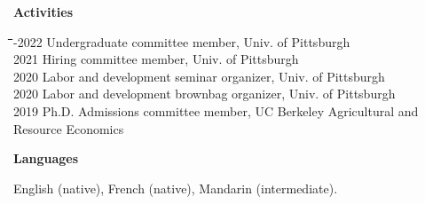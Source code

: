 \documentclass[10pt, oneside]{article}
\newcommand\mytabs{\hspace*{1cm}\=\hspace{1cm}\=\hspace{1cm}\=\hspace{1cm}\=\hspace{1cm}\=\hspace{1cm}\=\hspace{1cm}\=\hspace{1cm}\=\hspace{1cm}\=\hspace{1cm}}
\newenvironment{mysec}[1][\mytabs]
  {\begin{tabbing}#1\kill\ignorespaces}
  {\end{tabbing}}
\begin{document}
\begin{minipage}[t]{0.1\linewidth}
\textbf{Activities}
\end{minipage}\hspace{0.05\linewidth}
\begin{minipage}[t]{0.8\linewidth}
\begin{mysec}
2021-2022 \>\> Undergraduate committee member, Univ. of Pittsburgh\\
2021 \>\> Hiring committee member, Univ. of Pittsburgh\\
2020 \>\> Labor and development seminar organizer, Univ. of Pittsburgh\\
2020 \>\> Labor and development brownbag organizer, Univ. of Pittsburgh\\
2019 \>\> Ph.D. Admissions committee member, UC Berkeley Agricultural and Resource Economics\\

\end{mysec}
\end{minipage}\vspace{4mm}

\begin{minipage}[t]{0.1\linewidth}
\textbf{Languages}
\end{minipage}\hspace{0.05\linewidth}
\begin{minipage}[t]{0.8\linewidth}
English (native), French (native), Mandarin (intermediate).
\end{minipage}\vspace{5mm}
\end{document}
